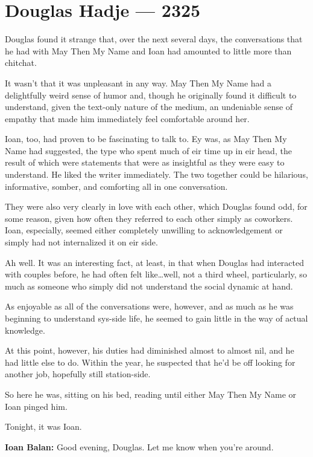 \hypertarget{douglas-hadje-2325}{%
\chapter{Douglas Hadje — 2325}\label{douglas-hadje-2325}}

Douglas found it strange that, over the next several days, the conversations that he had with May Then My Name and Ioan had amounted to little more than chitchat.

It wasn't that it was unpleasant in any way. May Then My Name had a delightfully weird sense of humor and, though he originally found it difficult to understand, given the text-only nature of the medium, an undeniable sense of empathy that made him immediately feel comfortable around her.

Ioan, too, had proven to be fascinating to talk to. Ey was, as May Then My Name had suggested, the type who spent much of eir time up in eir head, the result of which were statements that were as insightful as they were easy to understand. He liked the writer immediately. The two together could be hilarious, informative, somber, and comforting all in one conversation.

They were also very clearly in love with each other, which Douglas found odd, for some reason, given how often they referred to each other simply as coworkers. Ioan, especially, seemed either completely unwilling to acknowledgement or simply had not internalized it on eir side.

Ah well. It was an interesting fact, at least, in that when Douglas had interacted with couples before, he had often felt like\ldots well, not a third wheel, particularly, so much as someone who simply did not understand the social dynamic at hand.

As enjoyable as all of the conversations were, however, and as much as he was beginning to understand sys-side life, he seemed to gain little in the way of actual knowledge.

At this point, however, his duties had diminished almost to almost nil, and he had little else to do. Within the year, he suspected that he'd be off looking for another job, hopefully still station-side.

So here he was, sitting on his bed, reading until either May Then My Name or Ioan pinged him.

Tonight, it was Ioan.

\textbf{Ioan Balan:} Good evening, Douglas. Let me know when you're around.

